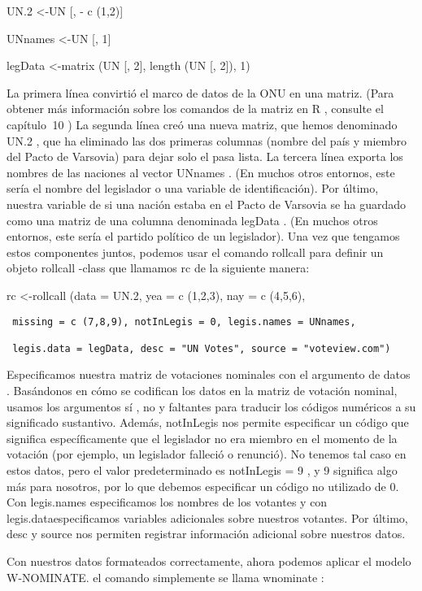 \documentclass[
]{book}
\begin{document}
UN.2 \textless-UN {[}, - c (1,2){]}

UNnames \textless-UN {[}, 1{]}

legData \textless-matrix (UN {[}, 2{]}, length (UN {[}, 2{]}), 1)

La primera línea convirtió el marco de datos de la ONU en una matriz. (Para obtener más información sobre los comandos de la matriz en R , consulte el capítulo  10 ) La segunda línea creó una nueva matriz, que hemos denominado UN.2 , que ha eliminado las dos primeras columnas (nombre del país y miembro del Pacto de Varsovia) para dejar solo el pasa lista. La tercera línea exporta los nombres de las naciones al vector UNnames . (En muchos otros entornos, este sería el nombre del legislador o una variable de identificación). Por último, nuestra variable de si una nación estaba en el Pacto de Varsovia se ha guardado como una matriz de una columna denominada legData . (En muchos otros entornos, este sería el partido político de un legislador). Una vez que tengamos estos componentes juntos, podemos usar el comando rollcall para definir un objeto rollcall -class que llamamos rc de la siguiente manera:

rc \textless-rollcall (data = UN.2, yea = c (1,2,3), nay = c (4,5,6),

\begin{verbatim}
 missing = c (7,8,9), notInLegis = 0, legis.names = UNnames,

 legis.data = legData, desc = "UN Votes", source = "voteview.com")
\end{verbatim}

Especificamos nuestra matriz de votaciones nominales con el argumento de datos . Basándonos en cómo se codifican los datos en la matriz de votación nominal, usamos los argumentos sí , no y faltantes para traducir los códigos numéricos a su significado sustantivo. Además, notInLegis nos permite especificar un código que significa específicamente que el legislador no era miembro en el momento de la votación (por ejemplo, un legislador falleció o renunció). No tenemos tal caso en estos datos, pero el valor predeterminado es notInLegis = 9 , y 9 significa algo más para nosotros, por lo que debemos especificar un código no utilizado de 0. Con legis.names especificamos los nombres de los votantes y con legis.dataespecificamos variables adicionales sobre nuestros votantes. Por último, desc y source nos permiten registrar información adicional sobre nuestros datos.

Con nuestros datos formateados correctamente, ahora podemos aplicar el modelo W-NOMINATE. el comando simplemente se llama wnominate :
\end{document}
